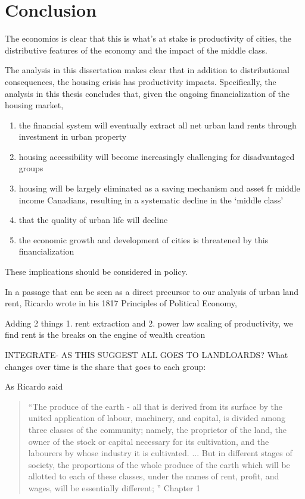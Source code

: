 
\chapter{Conclusion}

The economics is clear that this is what's at stake is productivity of cities, the distributive features of the economy and the impact of the middle class.

The analysis in this dissertation makes clear that in addition to distributional consequences, the housing crisis has productivity impacts. Specifically, the analysis in this thesis concludes that, given the ongoing financialization of the housing market,

\begin{enumerate}
\item the financial system will eventually extract all net urban land rents through investment in urban property
\item housing accessibility will become increasingly challenging for disadvantaged groups
\item housing will be largely eliminated as a saving mechanism and asset fr middle income Canadians,  resulting in a systematic decline in the `middle class'
\item that the quality of urban life will decline
\item the economic growth and development of cities is threatened by this financialization
\end{enumerate}


These implications should be considered in policy.




In a passage that can be seen as a direct precursor to our analysis of urban land rent, Ricardo  wrote in his 1817 Principles of Political Economy, %

Adding 2 things 1. rent extraction and 2. power law scaling of productivity, we find rent is the breaks on the engine of wealth creation

INTEGRATE- AS THIS SUGGEST ALL GOES TO LANDLOARDS?
What changes over time is the share that goes to each group:

As Ricardo said

\begin{quotation}   
 “The produce of the earth - all that is derived from its surface by the united application of labour, machinery, and capital, is divided among three classes of the community; namely, the proprietor of the land, the owner of the stock or capital necessary for its cultivation, and the labourers by whose industry it is cultivated. ...  But in different stages of society, the proportions of the whole produce of the earth which will be allotted to each of these classes, under the names of rent, profit, and wages, will be essentially different; ”  Chapter 1
\end{quotation}


